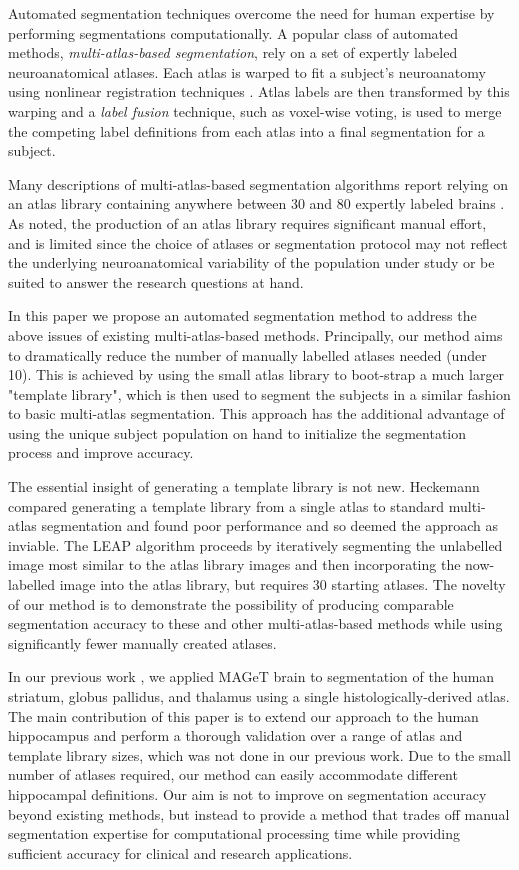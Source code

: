 \documentclass{article}\usepackage{graphicx, color}
\begin{document}
Automated segmentation techniques overcome the need for human expertise by
performing segmentations computationally.  A popular class of automated
methods, {\it multi-atlas-based segmentation}, rely on a set of expertly
labeled neuroanatomical atlases. Each atlas is warped to fit a subject's
neuroanatomy using nonlinear registration
techniques \citep{Collins1995,Klein2009}.  Atlas labels are then transformed by
this warping and a {\it label fusion} technique, such as voxel-wise voting, is
used to merge the competing label definitions from each atlas into a final
segmentation for a subject.  

Many descriptions of multi-atlas-based segmentation algorithms report relying
on an atlas library containing anywhere between 30 and 80 expertly labeled
brains \citep{Heckemann2011,Collins2010,Aljabar2009,Leung2010,Lotjonen2010}.  As
noted, the production of an atlas library requires significant manual effort,
and is limited since the choice of atlases or segmentation protocol may not
reflect the underlying neuroanatomical variability of the population under
study or be suited to answer the research questions at hand.

In this paper we propose an automated segmentation method to address the above
issues of existing multi-atlas-based methods. Principally, our method aims to
dramatically reduce the number of manually labelled atlases needed (under 10).
This is achieved by using the small atlas library to boot-strap a much larger
"template library", which is then used to segment the subjects in a similar
fashion to basic multi-atlas segmentation. This approach has the additional
advantage of using the unique subject population on hand to initialize the
segmentation process and improve accuracy.

The essential insight of generating a template library is not new.  Heckemann
\citep{Heckemann2006} compared generating a template library from a single atlas
to standard multi-atlas segmentation and found poor performance and so deemed
the approach as inviable.  The LEAP algorithm \citep{Wolz2010} proceeds by
iteratively segmenting the unlabelled image most similar to the atlas library
images and then incorporating the now-labelled image into the atlas library,
but requires 30 starting atlases.  The novelty of our method is to demonstrate
the possibility of producing comparable segmentation accuracy to these and
other multi-atlas-based methods while using significantly fewer manually
created atlases.

In our previous work \citep{Chakravarty2012}, we applied MAGeT brain to
segmentation of the human striatum, globus pallidus, and thalamus using a
single histologically-derived atlas. The main contribution of this paper is to
extend our approach to the human hippocampus and perform a thorough validation
over a range of atlas and template library sizes, which was not done in our
previous work.  Due to the small number of atlases required, our method can
easily accommodate different hippocampal definitions. Our aim is not to improve
on segmentation accuracy beyond existing methods, but instead to provide a
method that trades off manual segmentation expertise for computational
processing time while providing sufficient accuracy for clinical and research
applications.
\end{document}
